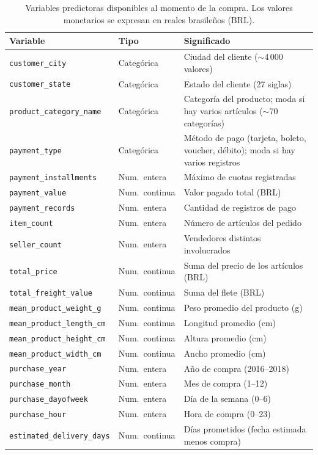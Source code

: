 \documentclass[journal]{IEEEtran}
\begin{document}
\begin{table}[t]
\caption{Variables predictoras disponibles al momento de la compra. Los valores monetarios se expresan en reales brasileños (BRL).}
\label{tab:predictores}
\centering\scriptsize
\begin{tabular}{p{3.0cm}p{1.3cm}p{3.5cm}}
\toprule
Variable & Tipo & Significado \\
\midrule
\texttt{customer\_city} & Categórica & Ciudad del cliente ($\sim$4\,000 valores) \\
\texttt{customer\_state} & Categórica & Estado del cliente (27 siglas) \\
\texttt{product\_category\_name} & Categórica & Categoría del producto; moda si hay varios artículos ($\sim$70 categorías) \\
\texttt{payment\_type} & Categórica & Método de pago (tarjeta, boleto, voucher, débito); moda si hay varios registros \\
\texttt{payment\_installments} & Num.\ entera & Máximo de cuotas registradas \\
\texttt{payment\_value} & Num.\ continua & Valor pagado total (BRL) \\
\texttt{payment\_records} & Num.\ entera & Cantidad de registros de pago \\
\texttt{item\_count} & Num.\ entera & Número de artículos del pedido \\
\texttt{seller\_count} & Num.\ entera & Vendedores distintos involucrados \\
\texttt{total\_price} & Num.\ continua & Suma del precio de los artículos (BRL) \\
\texttt{total\_freight\_value} & Num.\ continua & Suma del flete (BRL) \\
\texttt{mean\_product\_weight\_g} & Num.\ continua & Peso promedio del producto (g) \\
\texttt{mean\_product\_length\_cm} & Num.\ continua & Longitud promedio (cm) \\
\texttt{mean\_product\_height\_cm} & Num.\ continua & Altura promedio (cm) \\
\texttt{mean\_product\_width\_cm} & Num.\ continua & Ancho promedio (cm) \\
\texttt{purchase\_year} & Num.\ entera & Año de compra (2016--2018) \\
\texttt{purchase\_month} & Num.\ entera & Mes de compra (1--12) \\
\texttt{purchase\_dayofweek} & Num.\ entera & Día de la semana (0--6) \\
\texttt{purchase\_hour} & Num.\ entera & Hora de compra (0--23) \\
\texttt{estimated\_delivery\_days} & Num.\ continua & Días prometidos (fecha estimada menos compra) \\
\bottomrule
\end{tabular}
\end{table}
\end{document}
